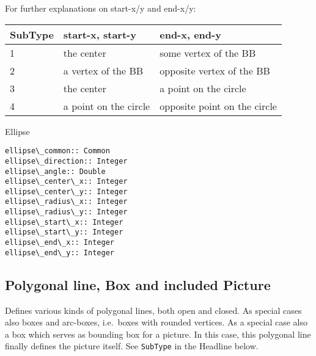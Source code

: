 \documentclass[10pt, a4paper]{article}%
\begin{document}
\noindent
For further explanations on start-x/y and end-x/y: \\
%
\begin{tabular}{lll}
\toprule
SubType  & start-x, start-y  & end-x, end-y \\
\midrule
\midrule
1 & the center            & some vertex of the BB \\
2 & a vertex of the BB    & opposite vertex of the BB \\
3 & the center            & a point on the circle \\
4 & a point on the circle & opposite point on the circle \\
\bottomrule
\end{tabular}

Ellipse	 

\begin{verbatim}
ellipse\_common:: Common
ellipse\_direction:: Integer
ellipse\_angle:: Double
ellipse\_center\_x:: Integer
ellipse\_center\_y:: Integer
ellipse\_radius\_x:: Integer
ellipse\_radius\_y:: Integer
ellipse\_start\_x:: Integer
ellipse\_start\_y:: Integer
ellipse\_end\_x:: Integer
ellipse\_end\_y:: Integer
\end{verbatim}

\subsection{Polygonal line, Box and included Picture}\label{subsec:polyline}

Defines various kinds of polygonal lines, both open and closed. 
As special cases also boxes and arc-boxes, i.e.~boxes with rounded vertices. 
As a special case also a box which serves as bounding box for a picture. 
In this case, this polygonal line finally defines the picture itself. 
See \texttt{SubType} in the Headline below. 
\end{document}

